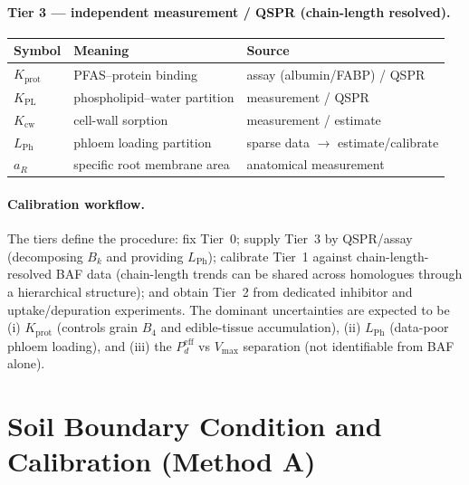 \documentclass[12pt,a4paper]{article}
\begin{document}
\paragraph{Tier 3 --- independent measurement / QSPR (chain-length resolved).}
\begin{center}
\renewcommand{\arraystretch}{1.25}
\begin{tabular}{@{}p{4.4cm}p{6.2cm}p{3.6cm}@{}}
\toprule
\textbf{Symbol} & \textbf{Meaning} & \textbf{Source} \\
\midrule
$K_\mathrm{prot}$ & PFAS--protein binding & assay (albumin/FABP) / QSPR \\
$K_\mathrm{PL}$ & phospholipid--water partition & measurement / QSPR \\
$K_\mathrm{cw}$ & cell-wall sorption & measurement / estimate \\
$L_\mathrm{Ph}$ & phloem loading partition & sparse data $\to$ estimate/calibrate \\
$a_R$ & specific root membrane area & anatomical measurement \\
\bottomrule
\end{tabular}
\end{center}

\paragraph{Calibration workflow.}  The tiers define the procedure: fix Tier~0; supply Tier~3 by QSPR/assay (decomposing $B_k$ and providing $L_\mathrm{Ph}$); calibrate Tier~1 against chain-length-resolved BAF data (chain-length trends can be shared across homologues through a hierarchical structure); and obtain Tier~2 from dedicated inhibitor and uptake/depuration experiments.  The dominant uncertainties are expected to be (i) $K_\mathrm{prot}$ (controls grain $B_4$ and edible-tissue accumulation), (ii) $L_\mathrm{Ph}$ (data-poor phloem loading), and (iii) the $P_d^{\mathrm{eff}}$ vs $V_{\max}$ separation (not identifiable from BAF alone).


\section{Soil Boundary Condition and Calibration (Method A)}
\end{document}

